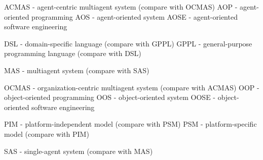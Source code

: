 

ACMAS - agent-centric multiagent system (compare with OCMAS)
AOP - agent-oriented programming
AOS - agent-oriented system
AOSE - agent-oriented software engineering

DSL - domain-specific language (compare with GPPL)
GPPL - general-purpose programming language (compare with DSL)

MAS - multiagent system (compare with SAS)

OCMAS - organization-centric multiagent system (compare with ACMAS)
OOP - object-oriented programming
OOS - object-oriented system
OOSE - object-oriented software engineering

PIM - platform-independent model (compare with PSM)
PSM - platform-specific model (compare with PIM)

SAS - single-agent system (compare with MAS)